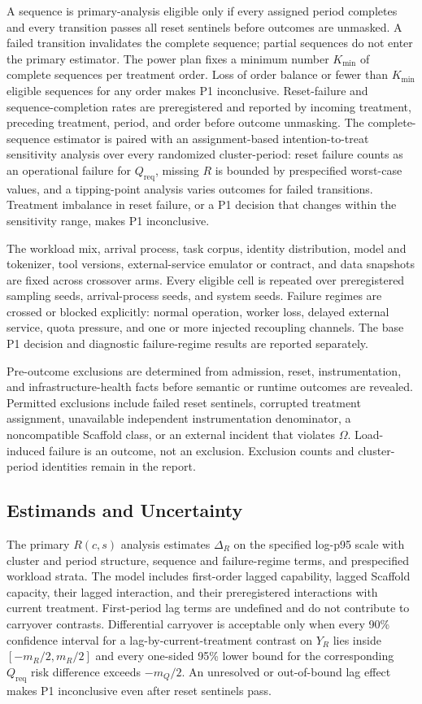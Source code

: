 A sequence is primary-analysis eligible only if every assigned period completes and every transition passes all reset sentinels before outcomes are unmasked. A failed transition invalidates the complete sequence; partial sequences do not enter the primary estimator. The power plan fixes a minimum number $K_{\min}$ of complete sequences per treatment order. Loss of order balance or fewer than $K_{\min}$ eligible sequences for any order makes P1 inconclusive. Reset-failure and sequence-completion rates are preregistered and reported by incoming treatment, preceding treatment, period, and order before outcome unmasking. The complete-sequence estimator is paired with an assignment-based intention-to-treat sensitivity analysis over every randomized cluster-period: reset failure counts as an operational failure for $Q_{\mathrm{req}}$, missing $R$ is bounded by prespecified worst-case values, and a tipping-point analysis varies outcomes for failed transitions. Treatment imbalance in reset failure, or a P1 decision that changes within the sensitivity range, makes P1 inconclusive.

The workload mix, arrival process, task corpus, identity distribution, model and tokenizer, tool versions, external-service emulator or contract, and data snapshots are fixed across crossover arms. Every eligible cell is repeated over preregistered sampling seeds, arrival-process seeds, and system seeds. Failure regimes are crossed or blocked explicitly: normal operation, worker loss, delayed external service, quota pressure, and one or more injected recoupling channels. The base P1 decision and diagnostic failure-regime results are reported separately.

Pre-outcome exclusions are determined from admission, reset, instrumentation, and infrastructure-health facts before semantic or runtime outcomes are revealed. Permitted exclusions include failed reset sentinels, corrupted treatment assignment, unavailable independent instrumentation denominator, a noncompatible Scaffold class, or an external incident that violates $\Omega$. Load-induced failure is an outcome, not an exclusion. Exclusion counts and cluster-period identities remain in the report.

\subsection{Estimands and Uncertainty}

The primary $R(c,s)$ analysis estimates $\Delta_R$ on the specified log-p95 scale with cluster and period structure, sequence and failure-regime terms, and prespecified workload strata. The model includes first-order lagged capability, lagged Scaffold capacity, their lagged interaction, and their preregistered interactions with current treatment. First-period lag terms are undefined and do not contribute to carryover contrasts. Differential carryover is acceptable only when every 90\% confidence interval for a lag-by-current-treatment contrast on $Y_R$ lies inside $[-m_R/2,m_R/2]$ and every one-sided 95\% lower bound for the corresponding $Q_{\mathrm{req}}$ risk difference exceeds $-m_Q/2$. An unresolved or out-of-bound lag effect makes P1 inconclusive even after reset sentinels pass.

